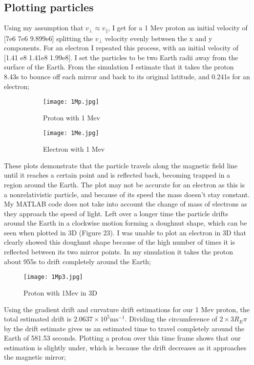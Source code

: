 \documentclass[14paper,11pt,hidelinks]{article}
\begin{document}
\subsection{Plotting particles}
Using my assumption that \begin{math} v_\bot\approx v_\parallel \end{math}, I get for a 1 Mev proton an initial velocity of [7e6 7e6 9.899e6] splitting the \begin{math} v_\bot \end{math} velocity evenly between the x and y components. For an electron I repeated this process, with an initial velocity of  [1.41 e8 1.41e8 1.99e8]. I set the particles to be two Earth radii away from the surface of the Earth. From the simulation I estimate that it takes the proton 8.43s to bounce off each mirror and back to its original latitude, and 0.241s for an electron;  
\begin{figure}[h!]
\centering
\begin{subfigure}[b]{0.3\linewidth}
\texttt{[image: 1Mp.jpg]} 
\caption*{Proton with 1 Mev}
\end{subfigure}
\begin{subfigure}[b]{0.3\linewidth}
\texttt{[image: 1Me.jpg]}
\caption*{Electron with 1 Mev}
\end{subfigure}
\caption{}
\end{figure}
\FloatBarrier
\noindent
These plots demonstrate that the particle travels along the magnetic field line until it reaches a certain point and is reflected back, becoming trapped in a region around the Earth. The plot may not be accurate for an electron as this is a nonrelativistic particle, and because of its speed the mass doesn't stay constant. My MATLAB code does not take into account the change of mass of electrons as they approach the speed of light. Left over a longer time the particle drifts around the Earth in a clockwise motion forming a doughnut shape, which can be seen when plotted in 3D (Figure 23). I was unable to plot an electron in 3D that clearly showed this doughnut shape because of the high number of times it is reflected between its two mirror points. In my simulation it takes the proton about 955s to drift completely around the Earth;
\begin{figure}[h!]
\centering
\texttt{[image: 1Mp3.jpg]} 
\caption{Proton with 1Mev in 3D}
\end{figure}
\FloatBarrier
\noindent
Using the gradient drift and curvature drift estimations for our 1 Mev proton, the total estimated drift is \begin{math} 2.0637\times 10^5 \mbox{ms}^{-1}\end{math}. Dividing the circumference of \begin{math}2\times3R_E \pi\end{math} by the drift estimate gives us an estimated time to travel completely around the Earth of 581.53 seconds. Plotting a proton over this time frame shows that our estimation is slightly under, which is because the drift decreases as it approaches the magnetic mirror;
\end{document}
